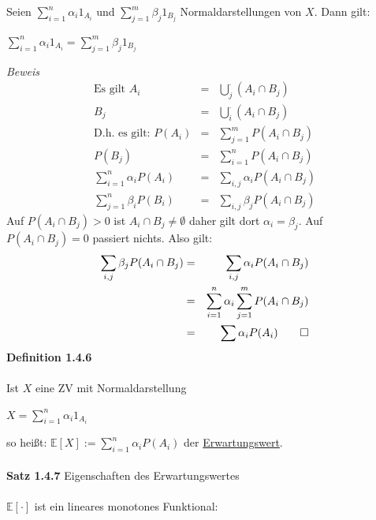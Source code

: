 \documentclass[10pt,a4paper]{report}
\numberwithin{equation}{section}
\numberwithin{figure}{section}
\theoremstyle{plain}
\theoremstyle{definition}
\theoremstyle{plain}
\theoremstyle{definition}
\theoremstyle{remark}
\theoremstyle{plain}
\begin{document}
Seien $\sum\limits_{i=1}^n \alpha_i 1_{A_i}$ und $\sum\limits_{j=1}^m\beta_j1_{B_j}$ Normaldarstellungen von $X$. Dann gilt:
\begin{center}
$\sum\limits_{i=1}^n \alpha_i 1_{A_i}=\sum\limits_{j=1}^m\beta_j1_{B_j}$
\end{center}
\textit{Beweis}
\begin{eqnarray*}
\text{Es gilt } A_i&=&\bigcup_j^\cdot (A_i\cap B_j)\\
B_j&=&\bigcup_i^\cdot (A_i\cap B_j)\\
\text{D.h. es gilt: } P(A_i)&=&\sum\limits_{j=1}^mP(A_i\cap B_j)\\
P(B_j)&=&\sum\limits_{i=1}^nP(A_i\cap B_j)\\
\sum\limits_{i=1}^n\alpha_iP(A_i)&=&\sum\limits_{i,j}\alpha_iP(A_i\cap B_j)\\
\sum\limits_{j=1}^n\beta_iP(B_i)&=&\sum\limits_{i,j}\beta_jP(A_i\cap B_j)
\end{eqnarray*}
Auf $P(A_i\cap B_j)>0$ ist $A_i\cap B_j \neq \emptyset$ daher gilt dort $\alpha_i=\beta_j$. Auf $P(A_i\cap B_j)=0$ passiert nichts. Also gilt:
\begin{eqnarray*}
\sum\limits_{i,j}\beta_jP(A_i\cap B_j)&=&\sum\limits_{i,j}\alpha_iP(A_i\cap B_j)\\
&=&\sum\limits_{i=1}^n\alpha_i\sum\limits_{j=1}^mP(A_i\cap B_j)\\
&=&\sum\limits \alpha_i P(A_i)\qed
\end{eqnarray*}
\textbf{Definition 1.4.6}\\\\
Ist $X$ eine ZV mit Normaldarstellung
\begin{center}
$X=\sum\limits_{i=1}^n\alpha_i1_{A_i}$
\end{center}
so heißt: $\mathbb{E}[X]:=\sum\limits_{i=1}^n\alpha_iP(A_i)$ der \underline{Erwartungswert}.\\\\
\textbf{Satz 1.4.7} Eigenschaften des Erwartungswertes\\\\
$\mathbb{E}[\cdot]$ ist ein lineares monotones Funktional:\\\\
\end{document}
